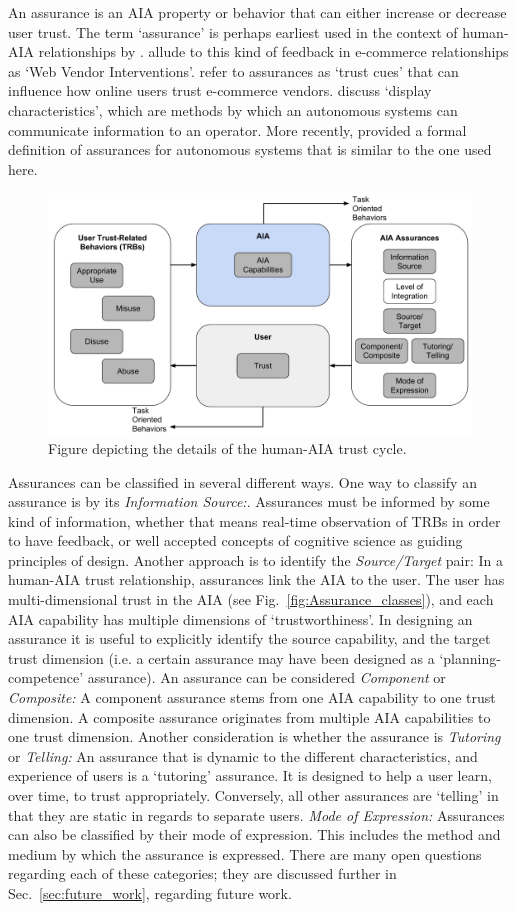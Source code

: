 An assurance is an AIA property or behavior that can either increase or decrease user trust. The term `assurance' is perhaps earliest used in the context of human-AIA relationships by \citet{Sheridan1984-kx}. \citet{McKnight2001-fa} allude to this kind of feedback in e-commerce relationships as `Web Vendor Interventions'. \citet{Corritore2003-gx} refer to assurances as `trust cues' that can influence how online users trust e-commerce vendors. \citet{Lee2004-pv} discuss `display characteristics', which are methods by which an autonomous systems can communicate information to an operator. More recently, \citet{Lillard2015-yg} provided a formal definition of assurances for autonomous systems that is similar to the one used here. 

\begin{figure}[t]%
    \centering
    \includegraphics[width=0.6\linewidth]{Figures/RefinedTrust_one_way.pdf}
    \caption{Figure depicting the details of the human-AIA trust cycle.}
    \label{fig:refined_trust}
\end{figure}

Assurances can be classified in several different ways. One way to classify an assurance is by its \emph{Information Source:}. Assurances must be informed by some kind of information, whether that means real-time observation of TRBs in order to have feedback, or well accepted concepts of cognitive science as guiding principles of design.
Another approach is to identify the \emph{Source/Target} pair: In a human-AIA trust relationship, assurances link the AIA to the user. The user has multi-dimensional trust in the AIA (see Fig.~\ref{fig:Assurance_classes}), and each AIA capability has multiple dimensions of `trustworthiness'. In designing an assurance it is useful to explicitly identify the source capability, and the target trust dimension (i.e. a certain assurance may have been designed as a `planning-competence' assurance).
An assurance can be considered \emph{Component} or \emph{Composite:} A component assurance stems from one AIA capability to one trust dimension. A composite assurance originates from multiple AIA capabilities to one trust dimension.
Another consideration is whether the assurance is \emph{Tutoring} or \emph{Telling:} An assurance that is dynamic to the different characteristics, and experience of users is a `tutoring' assurance. It is designed to help a user learn, over time, to trust appropriately. Conversely, all other assurances are `telling' in that they are static in regards to separate users.
\emph{Mode of Expression:} Assurances can also be classified by their mode of expression. This includes the method and medium by which the assurance is expressed.
There are many open questions regarding each of these categories; they are discussed further in Sec.~\ref{sec:future_work}, regarding future work.

